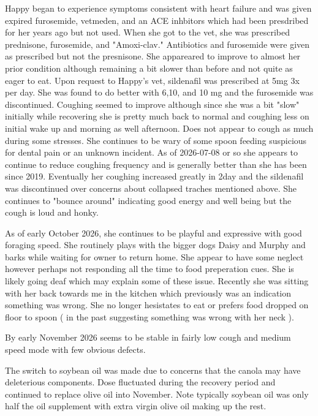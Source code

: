 Happy began to experience symptoms consistent with
heart failure and was given expired furosemide, vetmeden, and
an ACE inhbitors which had been presdribed for her years
ago but not used. When she got to the vet, she was prescribed
prednisone, furosemide, and "Amoxi-clav." Antibiotics and furosemide
were given as prescribed but not the presnisone. She appareared
to improve to almost her prior condition although remaining a bit
slower than before and not quite as eager to eat. 
Upon request
to Happy's vet, sildenafil was prescribed at 5mg 3x per day.
She was found to do better with 6,10, and 10 mg and the furosemide
was discontinued. 
Coughing seemed to improve although since she was a bit "slow"
initially while recovering she is pretty much back to normal 
and coughing less on initial wake up and morning as well afternoon.
Does not appear to cough as much during some stresses. 
She continues to be wary of some spoon feeding suspicious for dental
pain or an unknown incident. 
As of 2026-07-08 or so she appears to continue to reduce coughing
frequency and is generally better than she has been since 2019. 
Eventually her coughing increased greatly in 2day and the sildenafil
was discontinued over concerns about collapsed traches mentioned
above. She continues to "bounce around" indicating good energy
and well being but the cough is loud and honky. 

As of early October 2026, she continues to be playful and expressive
with good foraging speed. She routinely plays with the bigger dogs
Daisy and Murphy and barks while waiting for owner to return home.
She appear to have some neglect however perhaps not responding
all the time to food preperation cues. She is likely going deaf
which may explain some of these issue. Recently she was sitting 
with her back towards me in the kitchen which previously was
an indication something was wrong. She no longer hesistates to
eat or prefers food dropped on floor to spoon ( in the past 
suggesting something was wrong with her neck ). 

By early November 2026 seems to be stable in fairly low cough 
and medium speed mode with few obvious defects. 

The switch to soybean oil was made due to concerns that the
canola may have deleterious components. Dose fluctuated 
during the recovery period and continued to replace olive oil 
into November. Note typically soybean oil was only half the oil 
supplement with extra virgin olive oil making up the rest. 


